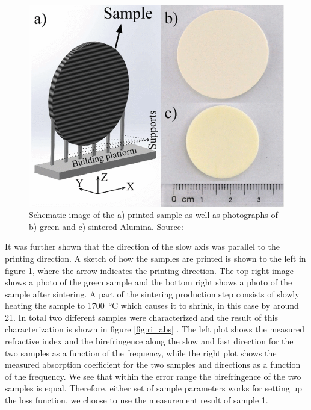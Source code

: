 \begin{figure}[ht]
    \centering
    \includegraphics[scale=0.4]{images/5_chapter05/ornikabclarge.png}
    \caption{Schematic image of the a) printed sample as well as photographs of b) green and c) sintered Alumina. Source: \cite{Ornik2021}}
    \label{fig:ornik1abc}
\end{figure}
It was further shown that the direction of the slow axis was parallel to the printing direction. A sketch of how the samples are printed is shown to the left in figure \ref{fig:ornik1abc}, where the arrow indicates the printing direction. The top right image shows a photo of the green sample and the bottom right shows a photo of the sample after sintering. A part of the sintering production step consists of slowly heating the sample to \SI{1700}{\celsius} which causes it to shrink, in this case by around \SI{21}{\volpercent}. In total two different samples were characterized and the result of this characterization is shown in figure \ref{fig:ri_abs} \cite{Ornik2021}. The left plot shows the measured refractive index and the birefringence along the slow and fast direction for the two samples as a function of the frequency, while the right plot shows the measured absorption coefficient for the two samples and directions as a function of the frequency. We see that within the error range the birefringence of the two samples is equal. Therefore, either set of sample parameters works for setting up the loss function, we choose to use the measurement result of sample 1. 

